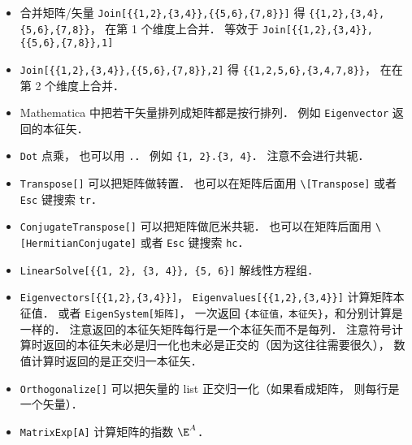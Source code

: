 \begin{itemize}
\item 合并矩阵/矢量 \verb|Join[{{1,2},{3,4}},{{5,6},{7,8}}]| 得 \verb|{{1,2},{3,4},{5,6},{7,8}}|， 在第 1 个维度上合并． 等效于 \verb|Join[{{1,2},{3,4}},{{5,6},{7,8}},1]|
\item \verb|Join[{{1,2},{3,4}},{{5,6},{7,8}},2]| 得 \verb|{{1,2,5,6},{3,4,7,8}}|， 在在第 2 个维度上合并．
\item Mathematica 中把若干矢量排列成矩阵都是按行排列． 例如 \verb|Eigenvector| 返回的本征矢．
\item \verb|Dot| 点乘， 也可以用 \verb|.|． 例如 \verb|{1, 2}.{3, 4}|． 注意不会进行共轭．
\item \verb|Transpose[]| 可以把矩阵做转置． 也可以在矩阵后面用 \verb|\[Transpose]| 或者 \verb|Esc| 键搜索 \verb|tr|．
\item \verb|ConjugateTranspose[]| 可以把矩阵做厄米共轭． 也可以在矩阵后面用 \verb|\[HermitianConjugate]| 或者 \verb|Esc| 键搜索 \verb|hc|．
\item \verb|LinearSolve[{{1, 2}, {3, 4}}, {5, 6}]| 解线性方程组．
\item \verb|Eigenvectors[{{1,2},{3,4}}]|， \verb|Eigenvalues[{{1,2},{3,4}}]| 计算矩阵本征值． 或者 \verb|EigenSystem[矩阵]|， 一次返回 \verb|{本征值，本征矢}|，和分别计算是一样的． 注意返回的本征矢矩阵每行是一个本征矢而不是每列． 注意符号计算时返回的本征矢未必是归一化也未必是正交的（因为这往往需要很久）， 数值计算时返回的是正交归一本征矢．
\item \verb|Orthogonalize[]| 可以把矢量的 list 正交归一化（如果看成矩阵， 则每行是一个矢量）．
\item \verb|MatrixExp[A]| 计算矩阵的指数 $\E^{A}$．
\end{itemize}


